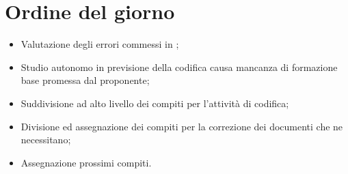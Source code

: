\documentclass[../verbale-2017-03-14.tex]{subfiles}
\begin{document}
	
\section{Ordine del giorno}
	\begin{itemize}
		\item Valutazione degli errori commessi in \revisionediprogettazione;
		\item Studio autonomo in previsione della codifica causa mancanza di formazione base promessa dal proponente;
		\item Suddivisione ad alto livello dei compiti per l'attività di codifica;
		\item Divisione ed assegnazione dei compiti per la correzione dei documenti che ne necessitano;
		\item Assegnazione prossimi compiti.
	\end{itemize}
	
\end{document}
